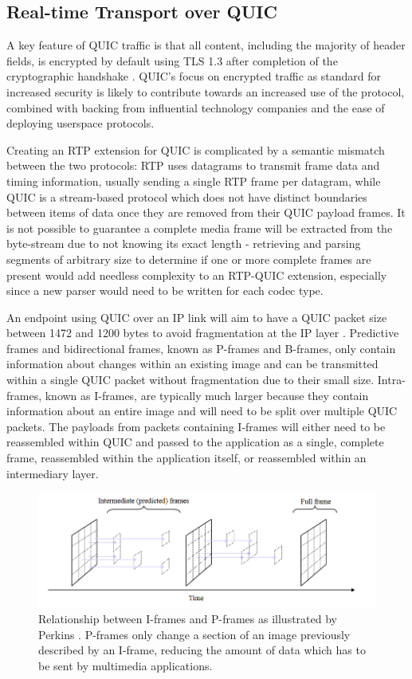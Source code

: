 \documentclass{mprop}
\begin{document}
\subsection{Real-time Transport over QUIC}

A key feature of QUIC traffic is that all content, including the majority of header fields, is 
encrypted by default using TLS 1.3 after completion of the cryptographic handshake 
\cite{quic-transport-16}. QUIC's focus on encrypted traffic as standard for increased security is 
likely to contribute towards an increased use of the protocol, combined with backing from 
influential technology companies and the ease of deploying userspace protocols.

Creating an RTP extension for QUIC is complicated by a semantic mismatch between the two protocols: RTP uses datagrams to transmit frame data and timing information, usually sending a single RTP frame per datagram, while QUIC is a stream-based protocol which does not have distinct boundaries between items of data once they are removed from their QUIC payload frames. It is not possible to guarantee a complete media frame will be extracted from the byte-stream due to not knowing its exact length - retrieving and parsing segments of arbitrary size to determine if one or more complete frames are present would add needless complexity to an RTP-QUIC extension, especially since a new parser would need to be written for each codec type.

An endpoint using QUIC over an IP link will aim to have a QUIC packet size between 1472 and 1200 bytes to avoid fragmentation at the IP layer \cite{quic-transport-16}. Predictive frames and bidirectional frames, known as P-frames and B-frames, only contain information about changes within an existing image and can be transmitted within a single QUIC packet without fragmentation due to their small size. Intra-frames, known as I-frames, are typically much larger because they contain information about an entire image and will need to be split over multiple QUIC packets. The payloads from packets containing I-frames will either need to be reassembled within QUIC and passed to the application as a single, complete frame, reassembled within the application itself, or reassembled within an intermediary layer.

\begin{figure}[h]
\includegraphics[scale=0.4]{images/iframepframe}
\centering
\caption{Relationship between I-frames and P-frames as illustrated by Perkins \cite{frame-diagram}. P-frames only change a section of an image previously described by an I-frame, reducing the amount of data which has to be sent by multimedia applications.}
\end{figure}
\end{document}
